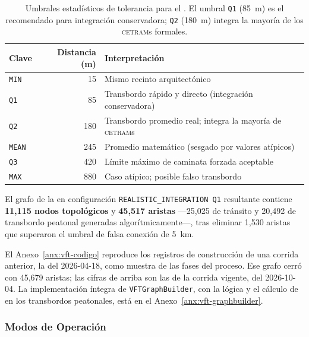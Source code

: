 \begin{table}[H]
    \centering
    \caption[Umbrales estadísticos de transbordo peatonal en \texttt{VFTModel}]{Umbrales
    estadísticos de tolerancia para el .
El umbral \texttt{Q1} (85~m) es el recomendado para integración conservadora;
    \texttt{Q2} (180~m) integra la mayoría de los \textsc{cetram}s formales.}
    \label{tab:vft-umbrales}
    \begin{tabularx}{\textwidth}{|l|r|X|}
        \hline
        \textbf{Clave} & \textbf{Distancia (m)} & \textbf{Interpretación} \\
        \hline
        \texttt{MIN}  &  15 & Mismo recinto arquitectónico \\
        \texttt{Q1}   &  85 & Transbordo rápido y directo (integración conservadora) \\
        \texttt{Q2}   & 180 & Transbordo promedio real; integra la mayoría de \textsc{cetram}s \\
        \texttt{MEAN} & 245 & Promedio matemático (sesgado por valores atípicos) \\
        \texttt{Q3}   & 420 & Límite máximo de caminata forzada aceptable \\
        \texttt{MAX}  & 880 & Caso atípico; posible falso transbordo \\
        \hline
    \end{tabularx}
\end{table}

El grafo de la \zmvm{} en configuración
\texttt{REALISTIC\_\allowbreak{}INTEGRATION Q1} resultante contiene
\textbf{11{,}115 nodos topológicos} y \textbf{45{,}517 aristas} —25{,}025 de
tránsito y 20{,}492 de transbordo peatonal generadas algorítmicamente—, tras
eliminar 1{,}530 aristas que superaron el umbral de falsa conexión de 5~km.

El Anexo~\ref{anx:vft-codigo} reproduce los registros de construcción de una
corrida anterior, la del 2026-04-18, como muestra de las fases del proceso. Ese
grafo cerró con 45{,}679 aristas; las cifras de arriba son las de la corrida
vigente, del 2026-10-04. La implementación íntegra de \texttt{VFTGraphBuilder},
con la lógica  y el cálculo de  en los
transbordos peatonales, está en el Anexo~\ref{anx:vft-graphbuilder}.

\subsubsection{Modos de Operación}
\label{subsec:vft-modos}

